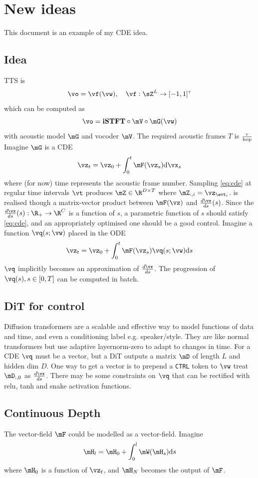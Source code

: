
\chapter{New ideas}
\label{chap:new_ideas}

This document is an example of my CDE idea.

\section{Idea}
\label{sec:examples}
TTS is 
\[
\vo = \vf(\vw), \quad \vf:\sZ^L \rightarrow[-1,1]^\tau
\]
which can be computed as
\[
\vo = \textbf{iSTFT}\circ\mV\circ\mG(\vw)
\]
with acoustic model $\mG$ and vocoder $\mV$.
The required acoustic frames $T$ is $\frac{\tau}{\textnormal{hop}}$
Imagine $\mG$ is a CDE
\[
\vz_t=\vz_0 + \int_0^t \mF(\vz_s)\mathrm{d}\vx_s
\label{eq:cde}
\]
where (for now) time represents the acoustic frame number. Sampling \eqref{eq:cde} at regular time intervals $\vt$ produces $\mZ\in\R^{D\times T}$ where $\mZ_{:,i}=\vz_{\evt_i}$.  is realised though a matrix-vector product between $\mF(\vz)$ and $\frac{d \vx}{d s}(s)$. Since the  $\frac{d \vx}{d s}(s): \R_+ \rightarrow\R^{C}$ is a function of $s$, a parametric function of $s$ should satisfy \eqref{eq:cde}, and an appropriately optimised one should be a good control.
Imagine a function $\vq(s;\vw)$ placed in the ODE
\[
\vz_t=\vz_0 + \int_0^t \mF(\vz_s)\vq(s;\vw)\mathrm{d}s
\label{eq:ditode}
\]
$\vq$ implicitly becomes an approximation of $\frac{d \vx}{d s}$. The progression of $\vq(s), s\in[0,T]$ can be computed in batch.

\section{DiT for control}
Diffusion transformers are a scalable and effective way to model functions of data and time, and even a conditioning label e.g. speaker/style. They are like normal transformers but use adaptive layernorm-zero to adapt to changes in time. For a CDE $\vq$ must be a vector, but a DiT outputs a matrix $\mD$ of length $L$ and hidden dim $D$. One way to get a vector is to prepend a \texttt{CTRL} token to $\vw$ treat $\mD_{:,0}$ as $\frac{d \vx}{d s}$. There may be some constraints on $\vq$ that can be rectified with relu, tanh and snake activation functions.

\section{Continuous Depth}
The vector-field $\mF$ could be modelled as a vector-field. Imagine
\[
\mH_l=\mH_0 + \int_0^l\mW(\mH_s)\mathrm{d}s
\]
where $\mH_0$ is a function of $\vz_t$, and $\mH_N$ becomes the output of $\mF$.

